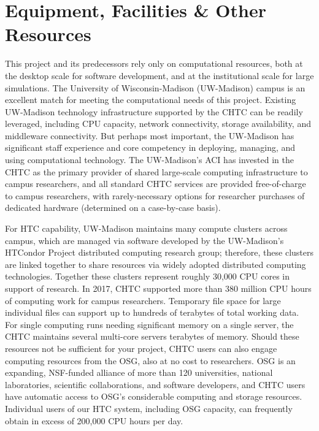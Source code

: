 \chapter{Equipment, Facilities \& Other Resources}


This project and its predecessors rely only on computational resources, both
at the desktop scale for software development, and at the institutional scale
for large simulations. The University of Wisconsin-Madison (UW-Madison) campus
is an excellent match for meeting the computational needs of this
project. Existing UW-Madison technology infrastructure supported by the
\gls{CHTC} can be readily leveraged, including CPU capacity, network
connectivity, storage availability, and middleware connectivity. But perhaps
most important, the UW-Madison has significant staff experience and core
competency in deploying, managing, and using computational technology. The
UW-Madison's \gls{ACI} has invested in the \gls{CHTC} as the primary provider
of shared large-scale computing infrastructure to campus researchers, and all
standard \gls{CHTC} services are provided free-of-charge to campus
researchers, with rarely-necessary options for researcher purchases of
dedicated hardware (determined on a case-by-case basis).

For \gls{HTC} capability, UW-Madison maintains many compute clusters across
campus, which are managed via software developed by the UW-Madison's HTCondor
Project distributed computing research group; therefore, these clusters are
linked together to share resources via widely adopted distributed computing
technologies. Together these clusters represent roughly 30,000 CPU cores in
support of research. In 2017, \gls{CHTC} supported more than 380 million CPU
hours of computing work for campus researchers. Temporary file space for large
individual files can support up to hundreds of terabytes of total working
data. For single computing runs needing significant memory on a single server,
the \gls{CHTC} maintains several multi-core servers terabytes of
memory. Should these resources not be sufficient for your project, \gls{CHTC}
users can also engage computing resources from the \gls{OSG}, also at no cost
to researchers. \gls{OSG} is an expanding, NSF-funded alliance of more than
120 universities, national laboratories, scientific collaborations, and
software developers, and \gls{CHTC} users have automatic access to \gls{OSG}'s
considerable computing and storage resources. Individual users of our
\gls{HTC} system, including \gls{OSG} capacity, can frequently obtain in
excess of 200,000 CPU hours per day.

